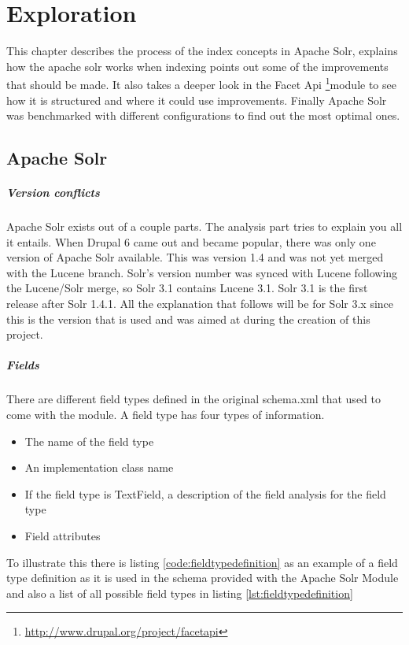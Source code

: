\chapter{Exploration}
This chapter describes the process of the index concepts in Apache Solr, explains how the apache solr works when indexing  points out some of the improvements that should be made. It also takes a deeper look in the Facet Api \footnote{\url{http://www.drupal.org/project/facetapi}}module to see how it is structured and where it could use improvements. 
Finally Apache Solr was benchmarked with different configurations to find out the most optimal ones.

\section{Apache Solr}
\paragraph{Version conflicts}
Apache Solr exists out of a couple parts. The analysis part tries to explain you all it entails. When Drupal 6 came out and became popular, there was only one version of Apache Solr available. This was version 1.4 and was not yet merged with the Lucene branch. Solr's version number was synced with Lucene following the Lucene/Solr merge, so Solr 3.1 contains Lucene 3.1. Solr 3.1 is the first release after Solr 1.4.1. All the explanation that follows will be for Solr 3.x since this is the version that is used and was aimed at during the creation of this project.

\paragraph{Fields}
There are different field types defined in the original schema.xml that used to come with the module. A field type has four types of information.
\begin{itemize}
  \item The name of the field type
  \item An implementation class name
  \item If the field type is TextField, a description of the field analysis for the field type
  \item Field attributes
\end{itemize}
To illustrate this there is listing \ref{code:fieldtypedefinition} as an example of a field type definition as it is used in the schema provided with the Apache Solr Module and also a list of all possible field types in listing \ref{lst:fieldtypedefinition}

